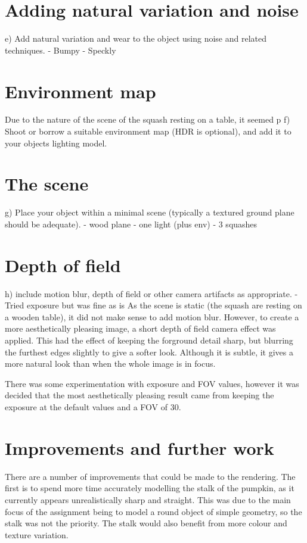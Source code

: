 \documentclass{scrartcl}
\begin{document}
\section{Adding natural variation and noise}
e) Add natural variation and wear to the object using noise and related techniques.
- Bumpy
- Speckly

\section{Environment map}
Due to the nature of the scene of the squash resting on a table, it seemed p
f) Shoot or borrow a suitable environment map (HDR is optional), and add it to your objects lighting model.

\section{The scene}
g) Place your object within a minimal scene (typically a textured ground plane should be adequate).
- wood plane
- one light (plus env)
- 3 squashes

\section{Depth of field}
h) include motion blur, depth of field or other camera artifacts as appropriate.
- Tried exposure but was fine as is
As the scene is static (the squash are resting on a wooden table), it did not make sense to add motion blur. However, to create a more aesthetically pleasing image, a short depth of field camera effect was applied. This had the effect of keeping the forground detail sharp, but blurring the furthest edges slightly to give a softer look. Although it is subtle, it gives a more natural look than when the whole image is in focus.

There was some experimentation with exposure and FOV values, however it was decided that the most aesthetically pleasing result came from keeping the exposure at the default values and a FOV of 30.

\section{Improvements and further work}
There are a number of improvements that could be made to the rendering. The first is to spend more time accurately modelling the stalk of the pumpkin, as it currently appears unrealistically sharp and straight. This was due to the main focus of the assignment being to model a round object of simple geometry, so the stalk was not the priority. The stalk would also benefit from more colour and texture variation.
\end{document}
